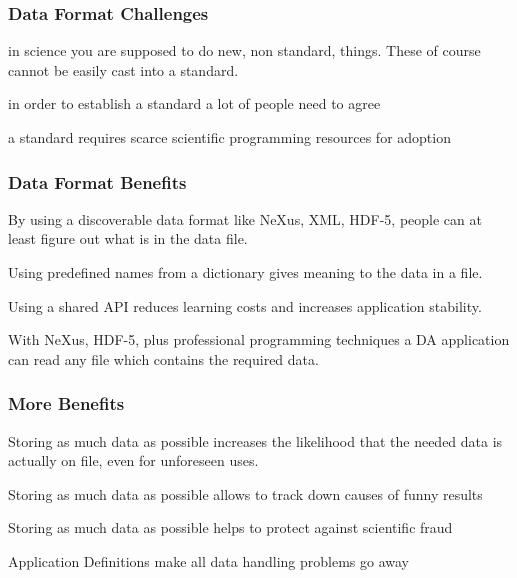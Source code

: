 \documentclass{beamer}
\begin{document}
\begin{frame} \frametitle{Data Format Challenges}
\begin{description}
\item<1->[Challenge 1] in science you are supposed to do new, non standard, things.  
 These of course cannot be easily cast into a standard.
\item<2->[Challenge 2] in order to establish a standard a lot of people need to agree
\item<3->[Challenge 3] a standard requires scarce scientific  programming resources for adoption 
\end{description}
\end{frame}

\begin{frame} \frametitle{Data Format Benefits}
\begin{description}
\item<1->[Benefit 1] By using a discoverable data format like NeXus, XML, HDF-5, people can at 
 least figure out  what is in the data file. 
\item<2->[Benefit 2] Using predefined names from a dictionary gives meaning to the data in a file.
\item<3->[Benefit 3] Using a shared API reduces learning costs and increases application stability.
\item<4->[Benefit 4] With NeXus, HDF-5, plus professional programming techniques a DA application can 
 read any file which contains the required data.
\end{description}
\end{frame}


\begin{frame} \frametitle{More Benefits}
\begin{description}
\item<1->[Benefit 5] Storing as much data as possible increases the likelihood that the needed 
 data is actually on file, even for unforeseen uses. 
\item<2->[Benefit 6] Storing as much data as possible allows to track down causes of funny results 
\item<3->[Benefit 7] Storing as much data as possible helps to protect against scientific fraud
\item<4->[Benefit 8] Application Definitions make all data handling problems go away
\end{description}
\end{frame}
\end{document}
